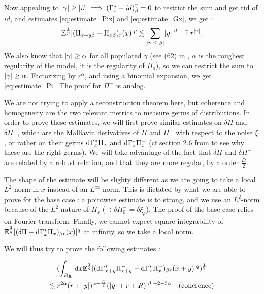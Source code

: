 Now appealing to $\lvert\gamma\rvert\geq \lvert\beta\rvert \implies(\Gamma^*_{x}-id)^{\gamma}_{\beta}=0$ to restrict the sum and get rid of $id$, and estimates \eqref{eq:estimate_Pix} and \eqref{eq:estimate_Gx}, we get :
\begin{equation}
    \mathbb{E}^{\frac{1}{p}} \lvert(\Pi_{x+y\beta}-\Pi_{x\beta})_r(x)\rvert^p \lesssim \sum_{\lvert\gamma\rvert\leq \lvert\beta\rvert} \lvert y\rvert^{\lvert\beta\rvert-\lvert\gamma\rvert} r^{\lvert\gamma\rvert}. 
\end{equation}
We also know that $\lvert\gamma\rvert \geq \alpha$ for all populated $\gamma$ (see (62) in \cite{BOT25}, $\alpha$ is the roughest regularity of the model, it is the regularity of $\Pi_0$), so we can restrict the sum to $\lvert\gamma\rvert \geq \alpha$.
Factorizing by $r^{\alpha}$, and using a binomial expansion, we get \eqref{eq:estimate_Pi}.
The proof for $\Pi^-$ is analog.
\endproof

We are not trying to apply a reconstruction theorem here, but coherence and homogeneity are the two relevant metrics to measure germs of distributions.
In order to prove these estimates, we will first prove similar estimates on $\delta \Pi$ and $\delta \Pi^-$, which are the Malliavin derivatives of $\Pi$ and $\Pi^-$ with respect to the noise $\xi$, or rather on their germs $\mathrm{d}\Gamma^*_x \Pi_x$ and $\mathrm{d}\Gamma^*_x \Pi^-_x$ (cf section 2.6 from \cite{BOT25} to see why these are the right germs). We will take advantage of the fact that $\delta \Pi$ and $\delta \Pi^-$ are related by a robust relation, and that they are more regular, by a order $\frac{D}{2}$.

The shape of the estimate will be slighty different as we are going to take a local $L^2$-norm in $x$ instead of an $L^\infty$ norm. This is dictated by what we are able to prove for the base case : a pointwise estimate is to strong, and we use an $L^2$-norm because of the $L^2$ nature of $\dot{H}_s$ ($\ni \delta \Pi^-_0 = \delta \xi_\rho$). The proof of the base case relies on Fourier transform.
Finally, we cannot expect square integrability of $\mathbb{E}^{\frac{2}{q}}\lvert(\delta \Pi - \mathrm{d}\Gamma^*_{x} \Pi_{x})_{\beta r}(x)\rvert^q$ at infinity, so we take a local norm.

We will thus try to prove the following estimates :


\begin{multline}  
    (\int_{B_R} \,\mathrm{d} x \mathbb{E}^{\frac{2}{q}} \lvert(\mathrm{d}\Gamma^*_{x+y} \Pi^-_{x+y} - \mathrm{d}\Gamma^*_{x} \Pi^-_{x})_{\beta r}(x+y)\rvert^q)^{\frac{1}{2}}\\
    \lesssim r^{2\alpha}(r+\lvert y\rvert)^{\alpha + \frac{D}{2}}(\lvert y\rvert+r+R)^{\lvert\beta\rvert-2-3\alpha} \quad \text{(coherence)} \label{eq:coherencedGPi}
\end{multline}

